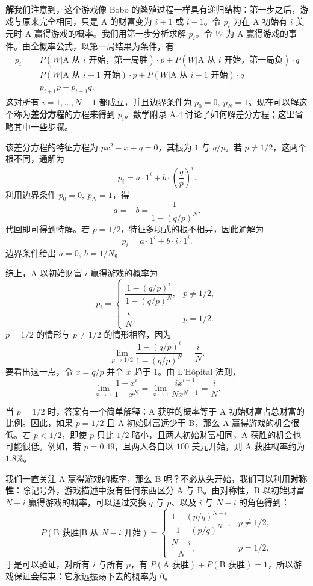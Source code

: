 \documentclass[UTF8,12pt,a4paper,fontset=fandol]{ctexart}
\begin{document}
\noindent\textbf{解}\quad 我们注意到，这个游戏像 Bobo 的繁殖过程一样具有递归结构：第一步之后，游戏与原来完全相同，只是 A 的财富变为 $i+1$ 或 $i-1$。令 $p_i$ 为在 A 初始有 $i$ 美元时 A 赢得游戏的概率。我们用第一步分析求解 $p_i$。令 $W$ 为 A 赢得游戏的事件。由全概率公式，以第一局结果为条件，有
\[
\begin{aligned}
  p_i
  &=
  P(W|\text{A 从 } i \text{ 开始，第一局胜})\cdot p
  +P(W|\text{A 从 } i \text{ 开始，第一局负})\cdot q\\
  &=
  P(W|\text{A 从 } i+1 \text{ 开始})\cdot p
  +P(W|\text{A 从 } i-1 \text{ 开始})\cdot q\\
  &=
  p_{i+1}p+p_{i-1}q.
\end{aligned}
\]
这对所有 $i=1,\ldots,N-1$ 都成立，并且边界条件为 $p_0=0,\ p_N=1$。现在可以解这个称为\textbf{差分方程}的方程来得到 $p_i$。数学附录 A.4 讨论了如何解差分方程；这里省略其中一些步骤。

该差分方程的特征方程为 $px^2-x+q=0$，其根为 $1$ 与 $q/p$。若 $p\ne 1/2$，这两个根不同，通解为
\[
  p_i=a\cdot 1^i+b\cdot\left(\frac{q}{p}\right)^i.
\]
利用边界条件 $p_0=0,\ p_N=1$，得
\[
  a=-b=\frac{1}{1-(q/p)^N}.
\]
代回即可得到特解。若 $p=1/2$，特征多项式的根不相异，因此通解为
\[
  p_i=a\cdot 1^i+b\cdot i\cdot 1^i.
\]
边界条件给出 $a=0,\ b=1/N$。

综上，A 以初始财富 $i$ 赢得游戏的概率为
\[
  p_i=
  \begin{cases}
    \dfrac{1-(q/p)^i}{1-(q/p)^N}, & p\ne 1/2,\\[1.2ex]
    \dfrac{i}{N}, & p=1/2.
  \end{cases}
\]
$p=1/2$ 的情形与 $p\ne 1/2$ 的情形相容，因为
\[
  \lim_{p\to 1/2}\frac{1-(q/p)^i}{1-(q/p)^N}=\frac{i}{N}.
\]
要看出这一点，令 $x=q/p$ 并令 $x$ 趋于 $1$。由 L'H\^opital 法则，
\[
  \lim_{x\to 1}\frac{1-x^i}{1-x^N}
  =
  \lim_{x\to 1}\frac{i x^{i-1}}{N x^{N-1}}
  =
  \frac{i}{N}.
\]

当 $p=1/2$ 时，答案有一个简单解释：A 获胜的概率等于 A 初始财富占总财富的比例。因此，如果 $p=1/2$ 且 A 初始财富远少于 B，那么 A 赢得游戏的机会很低。若 $p<1/2$，即使 $p$ 只比 $1/2$ 略小，且两人初始财富相同，A 获胜的机会也可能很低。例如，若 $p=0.49$，且两人各自以 $100$ 美元开始，则 A 获胜概率约为 $1.8\%$。

我们一直关注 A 赢得游戏的概率，那么 B 呢？不必从头开始，我们可以利用\textbf{对称性}：除记号外，游戏描述中没有任何东西区分 A 与 B。由对称性，B 以初始财富 $N-i$ 赢得游戏的概率，可以通过交换 $q$ 与 $p$、以及 $i$ 与 $N-i$ 的角色得到：
\[
  P(\text{B 获胜}|\text{B 从 }N-i\text{ 开始})
  =
  \begin{cases}
    \dfrac{1-(p/q)^{N-i}}{1-(p/q)^N}, & p\ne 1/2,\\[1.2ex]
    \dfrac{N-i}{N}, & p=1/2.
  \end{cases}
\]
于是可以验证，对所有 $i$ 与所有 $p$，有 $P(\text{A 获胜})+P(\text{B 获胜})=1$，所以游戏保证会结束：它永远振荡下去的概率为 $0$。
\end{document}
